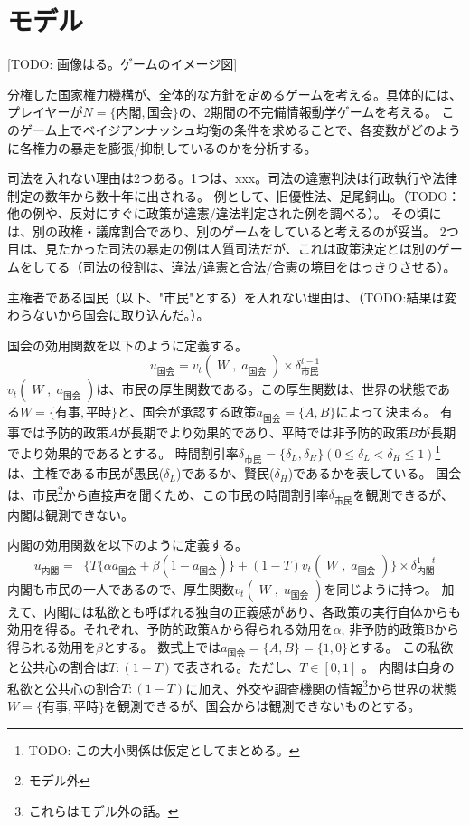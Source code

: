 \documentclass[main.tex]{subfiles}
\begin{document}
\section{モデル}

[TODO: 画像はる。ゲームのイメージ図]

分権した国家権力機構が、全体的な方針を定めるゲームを考える。具体的には、
プレイヤーが$N=\lbrace 内閣, 国会 \rbrace$の、2期間の不完備情報動学ゲームを考える。
このゲーム上でベイジアンナッシュ均衡の条件を求めることで、各変数がどのように各権力の暴走を膨張/抑制しているのかを分析する。



司法を入れない理由は2つある。1つは、xxx。司法の違憲判決は行政執行や法律制定の数年から数十年に出される。
例として、旧優性法、足尾銅山。（TODO：他の例や、反対にすぐに政策が違憲/違法判定された例を調べる）。
その頃には、別の政権・議席割合であり、別のゲームをしていると考えるのが妥当。
2つ目は、見たかった司法の暴走の例は人質司法だが、これは政策決定とは別のゲームをしてる（司法の役割は、違法/違憲と合法/合憲の境目をはっきりさせる）。

主権者である国民（以下、"市民"とする）を入れない理由は、（TODO:結果は変わらないから国会に取り込んだ。）。


国会の効用関数を以下のように定義する。
$$u_\text{国会} = v_t(\;W\;,\; a_\text{国会}\;) × \delta^{t-1}_\text{市民}$$
$v_t(\;W\;,\; a_\text{国会}\;)$は、市民の厚生関数である。この厚生関数は、世界の状態である$W=\lbrace 有事, 平時\rbrace$と、国会が承認する政策$a_{国会}=\lbrace A, B\rbrace$によって決まる。
有事では予防的政策$A$が長期でより効果的であり、平時では非予防的政策$B$が長期でより効果的であるとする。
時間割引率$\delta_{市民}=\lbrace \delta_L, \delta_H \rbrace (0\le \delta_L<\delta_H \le 1)$\footnote{TODO: この大小関係は仮定としてまとめる。}は、主権である市民が愚民($\delta_L$)であるか、賢民($\delta_H$)であるかを表している。
国会は、市民\footnote{モデル外}から直接声を聞くため、この市民の時間割引率$\delta_{市民}$を観測できるが、内閣は観測できない。

内閣の効用関数を以下のように定義する。
$$ u_\text{内閣} =\;\; \lbrace T\lbrace \alpha a_\text{国会} + \beta (1-a_\text{国会}) \rbrace  + (1-T)v_t(\;W\;,\; a_\text{国会}\;) \rbrace × \delta^{1-t}_{内閣}$$
内閣も市民の一人であるので、厚生関数$v_t(\;W\;,\; u_\text{国会}\;)$を同じように持つ。
加えて、内閣には私欲とも呼ばれる独自の正義感があり、各政策の実行自体からも効用を得る。それぞれ、予防的政策Aから得られる効用を$\alpha$, 非予防的政策Bから得られる効用を$\beta$とする。
数式上では$a_{国会}=\lbrace A, B\rbrace = \lbrace 1,0\rbrace$とする。
この私欲と公共心の割合は$T:(1-T)$で表される。ただし、$T\in[0,1]$ 。
内閣は自身の私欲と公共心の割合$T:(1-T)$に加え、外交や調査機関の情報\footnote{これらはモデル外の話。}から世界の状態$W=\lbrace 有事, 平時\rbrace$を観測できるが、国会からは観測できないものとする。
\end{document}

